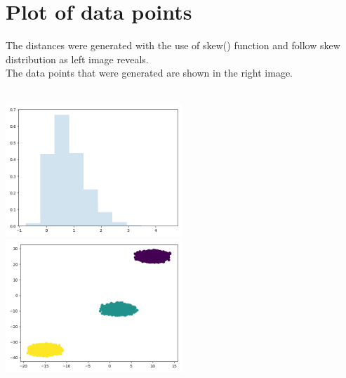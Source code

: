 \section{Plot of data points}
The distances were generated with the use of skew() function and follow skew distribution as left image reveals. \\
The data points that were generated are shown in the right image.

\HRule \\[0.2cm] %
	\includegraphics[width=0.5\textwidth]{../images/histogramOfDistancePoints.png}
	\includegraphics[width=0.5\textwidth]{../images/clustersCreatedImage.png}\\

